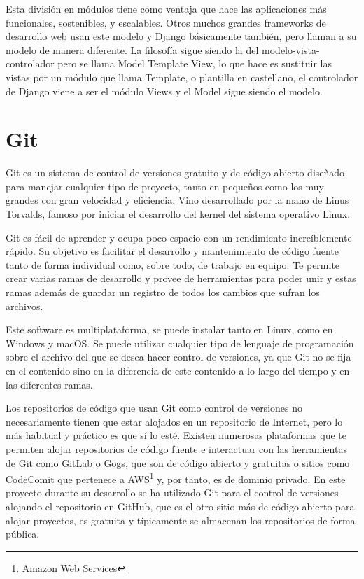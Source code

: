 \documentclass[a4paper, 12pt]{book}
\begin{document}
Esta división en módulos tiene como ventaja que hace las aplicaciones más funcionales, sostenibles, y escalables. Otros muchos grandes frameworks de desarrollo web usan este modelo y Django básicamente también, pero llaman a su modelo de manera diferente. La filosofía sigue siendo la del modelo-vista-controlador pero se llama Model Template View, lo que hace es sustituir las vistas por un módulo que llama Template, o plantilla en castellano, el controlador de Django viene a ser el módulo Views y el Model sigue siendo el modelo.

\section{Git}
\label{sec:git}
Git es un sistema de control de versiones gratuito y de código abierto diseñado para manejar cualquier tipo de proyecto, tanto en pequeños como los muy grandes con gran velocidad y eficiencia. Vino desarrollado por la mano de Linus Torvalds, famoso por iniciar el desarrollo del kernel del sistema operativo Linux. 

Git es fácil de aprender y ocupa poco espacio con un rendimiento increíblemente rápido. Su objetivo es facilitar el desarrollo y mantenimiento de código fuente tanto de forma individual como, sobre todo, de trabajo en equipo. Te permite crear varias ramas de desarrollo y provee de herramientas para poder unir y estas ramas además de guardar un registro de todos los cambios que sufran los archivos. 

Este software es multiplataforma, se puede instalar tanto en Linux, como en Windows y macOS. Se puede utilizar cualquier tipo de lenguaje de programación sobre el archivo del que se desea hacer control de versiones, ya que Git no se fija en el contenido sino en la diferencia de este contenido a lo largo del tiempo y en las diferentes ramas. 

Los repositorios de código que usan Git como control de versiones no necesariamente tienen que estar alojados en un repositorio de Internet, pero lo más habitual y práctico es que sí lo esté. Existen numerosas plataformas que te permiten alojar repositorios de código fuente e interactuar con las herramientas de Git como GitLab o Gogs, que son de código abierto y gratuitas o sitios como CodeComit que pertenece a AWS\footnote{Amazon Web Services} y, por tanto, es de dominio privado. En este proyecto durante su desarrollo se ha utilizado Git para el control de versiones alojando el repositorio en GitHub, que es el otro sitio más de código abierto para alojar proyectos, es gratuita y típicamente se almacenan los repositorios de forma pública.
\end{document}
